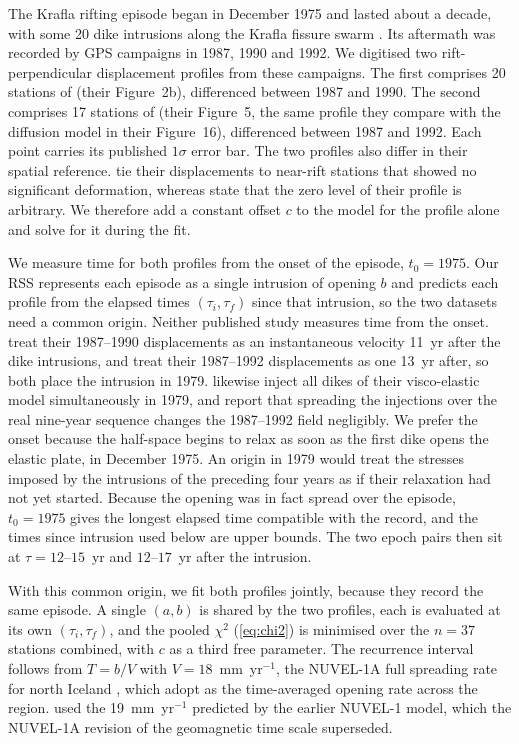\documentclass[extra]{gji}
\begin{document}
The Krafla rifting episode began in December 1975 and lasted about a
decade, with some 20 dike intrusions along the Krafla fissure swarm
\citep{hofton1996post}. Its aftermath was recorded by GPS campaigns in
1987, 1990 and 1992. We digitised two rift-perpendicular displacement
profiles from these campaigns. The first comprises 20 stations of
\citet{foulger1992post} (their Figure~2b), differenced between 1987 and
1990. The second comprises 17 stations of \citet{hofton1996post} (their
Figure~5, the same profile they compare with the diffusion model in their
Figure~16), differenced between 1987 and 1992. Each point carries its
published $1\sigma$ error bar. The two profiles also differ in their
spatial reference. \citet{foulger1992post} tie their displacements to
near-rift stations that showed no significant deformation, whereas
\citet{hofton1996post} state that the zero level of their profile is
arbitrary. We therefore add a constant offset $c$ to the model for the
\citet{hofton1996post} profile alone and solve for it during the fit.

We measure time for both profiles from the onset of the episode,
$t_0 = 1975$. Our RSS represents each episode as a single intrusion of
opening $b$ and predicts each profile from the elapsed times
$(\tau_i,\tau_f)$ since that intrusion, so the two datasets need a common
origin. Neither published study measures time from the onset.
\citet{foulger1992post} treat their 1987--1990 displacements as an
instantaneous velocity 11~yr after the dike intrusions, and
\citet{hofton1996post} treat their 1987--1992 displacements as one 13~yr
after, so both place the intrusion in 1979. \citet{hofton1996post}
likewise inject all dikes of their visco-elastic model simultaneously in
1979, and report that spreading the injections over the real nine-year
sequence changes the 1987--1992 field negligibly. We prefer the onset
because the half-space begins to relax as soon as the first dike opens the
elastic plate, in December 1975. An origin in 1979 would treat the stresses imposed by the intrusions of the
preceding four years as if their relaxation had not yet started. Because
the opening was in fact spread over the episode, $t_0 = 1975$ gives the
longest elapsed time compatible with the record, and the times since
intrusion used below are upper bounds. The two epoch pairs then sit at
$\tau = 12$--$15$~yr and $12$--$17$~yr after the intrusion.

With this common origin, we fit both profiles jointly, because they
record the same episode.  A single $(a,b)$ is shared by the two profiles,
each is evaluated at its own $(\tau_i,\tau_f)$, and the pooled $\chi^2$
(\ref{eq:chi2}) is minimised over the $n=37$ stations combined, with $c$
as a third free parameter. The recurrence interval follows from $T = b/V$ with
$V=18$~mm~yr$^{-1}$, the NUVEL-1A full spreading rate
for north Iceland \citep{demets1994effect}, which \citet{hofton1996post}
adopt as the time-averaged opening rate across the region.
\citet{foulger1992post} used the 19~mm~yr$^{-1}$ predicted by the earlier
NUVEL-1 model, which the NUVEL-1A revision of the geomagnetic time scale
superseded.
\end{document}
